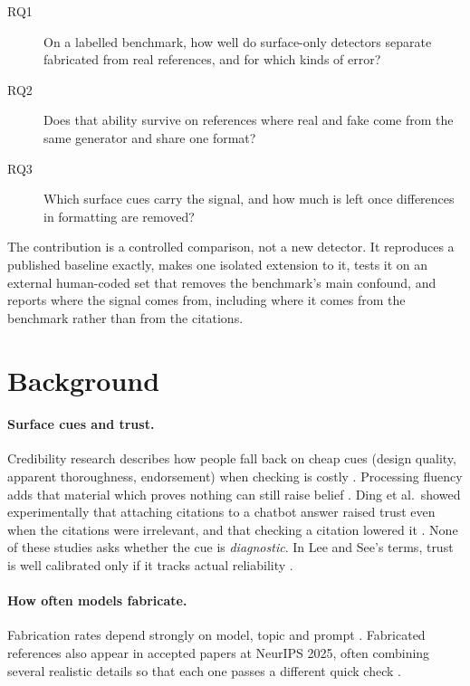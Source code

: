 \documentclass[acmsmall,nonacm]{acmart}
\begin{document}
\begin{description}
  \item[RQ1] On a labelled benchmark, how well do surface-only detectors separate fabricated from real references, and for which kinds of error?
  \item[RQ2] Does that ability survive on references where real and fake come from the same generator and share one format?
  \item[RQ3] Which surface cues carry the signal, and how much is left once differences in formatting are removed?
\end{description}

The contribution is a controlled comparison, not a new detector. It reproduces a published baseline exactly, makes one isolated extension to it, tests it on an external human-coded set that removes the benchmark's main confound, and reports where the signal comes from, including where it comes from the benchmark rather than from the citations.

\section{Background}

\paragraph{Surface cues and trust.} Credibility research describes how people fall back on cheap cues (design quality, apparent thoroughness, endorsement) when checking is costly \cite{metzger2013}. Processing fluency adds that material which proves nothing can still raise belief \cite{newman2012}. Ding et al.\ showed experimentally that attaching citations to a chatbot answer raised trust even when the citations were irrelevant, and that checking a citation lowered it \cite{ding2025}. None of these studies asks whether the cue is \emph{diagnostic}. In Lee and See's terms, trust is well calibrated only if it tracks actual reliability \cite{leesee2004}.

\paragraph{How often models fabricate.} Fabrication rates depend strongly on model, topic and prompt \cite{walters2023,linardon2025,naser2026}. Fabricated references also appear in accepted papers at NeurIPS 2025, often combining several realistic details so that each one passes a different quick check \cite{ansari2026}.
\end{document}
